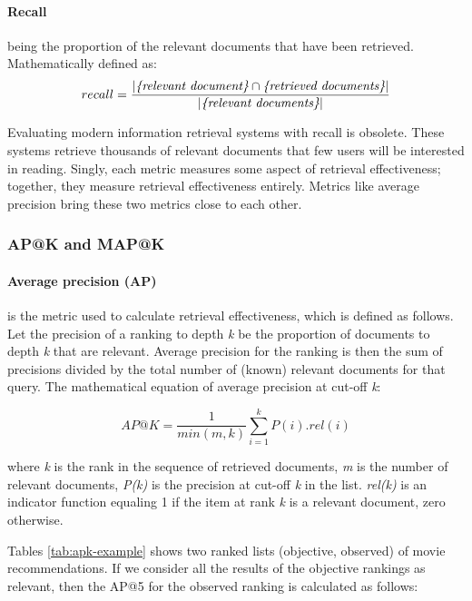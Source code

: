\paragraph*{Recall} being the proportion of the relevant documents that have been retrieved. Mathematically defined as:
\begin{equation}
    recall = \frac{|\emph{\{relevant document\}} \cap \emph{\{retrieved documents\}}|}{|\emph{\{relevant documents\}}|}
    \label{eq:recall}
\end{equation}

Evaluating modern information retrieval systems with recall is obsolete. These systems retrieve thousands of relevant documents that few users will be interested in reading. Singly, each metric measures some aspect of retrieval effectiveness; together, they measure retrieval effectiveness entirely. Metrics like average precision bring these two metrics close to each other.

\subsubsection{AP@K and MAP@K}
\label{subsubsec:ap@k-map@k}
\paragraph*{Average precision (AP)} is the metric used to calculate retrieval effectiveness, which is defined as follows. 
Let the precision of a ranking to depth \emph{k} be
the proportion of documents to depth \emph{k} that are relevant.
Average precision for the ranking is then the sum of precisions divided by the total number of (known) relevant documents for that query.
The mathematical equation of average precision at cut-off \emph{k}:

\begin{equation}
    AP@K = \frac{1}{min(m,k)}\sum_{i=1}^{k}P(i).rel(i)
    \label{eq:ap@k}
\end{equation}

where \emph{k} is the rank in the sequence of retrieved documents, \emph{m} is the number of relevant documents, \emph{P(k)} is the precision at cut-off \emph{k} in the list. \emph{rel(k)}
is an indicator function equaling 1 if the item at rank \emph{k} is a relevant document, zero otherwise.

Tables \ref{tab:apk-example} shows two ranked lists (objective, observed) of movie recommendations. If we consider all the results of the objective rankings as relevant, then the AP@5 for the observed ranking is calculated as follows:

